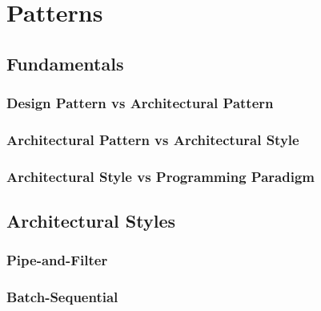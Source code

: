 \chapter{Patterns}
\label{ch:patterns}


\section{Fundamentals}


\subsection{Design Pattern vs Architectural Pattern}


\subsection{Architectural Pattern vs Architectural Style}


\subsection{Architectural Style vs Programming Paradigm}


\section{Architectural Styles}


\subsection{Pipe-and-Filter}


\subsection{Batch-Sequential}


